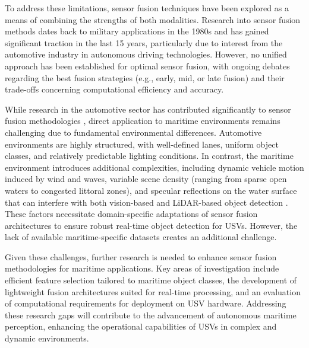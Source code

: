 \documentclass{erauthesis}
\begin{document}
To address these limitations, sensor fusion techniques have been explored as a means of combining the strengths of both modalities. 
Research into sensor fusion methods dates back to military applications in the 1980s and has gained significant traction in the last 15 years, particularly due to interest from the automotive industry in autonomous driving technologies. However, no unified approach has been established for optimal sensor fusion, with ongoing debates regarding the best fusion strategies (e.g., early, mid, or late fusion) and their trade-offs concerning computational efficiency and accuracy.

While research in the automotive sector has contributed significantly to sensor fusion methodologies \cite{yeong2021,clunie2021,roriz2022,cui2022,das2022,liu2023a}, direct application to maritime environments remains challenging due to fundamental environmental differences. 
Automotive environments are highly structured, with well-defined lanes, uniform object classes, and relatively predictable lighting conditions. 
In contrast, the maritime environment introduces additional complexities, including dynamic vehicle motion induced by wind and waves, variable scene density (ranging from sparse open waters to congested littoral zones), and specular reflections on the water surface that can interfere with both vision-based \cite{liu2023a} and \ac{LiDAR}-based object detection \cite{ahmed2024}.%
These factors necessitate domain-specific adaptations of sensor fusion architectures to ensure robust real-time object detection for \acp{USV}. 
However, the lack of available maritime-specific datasets \cite{jun-hwa2022,su2023,thompson2023} creates an additional challenge.

Given these challenges, further research is needed to enhance sensor fusion methodologies for maritime applications. 
Key areas of investigation include efficient feature selection tailored to maritime object classes, the development of lightweight fusion architectures suited for real-time processing, and an evaluation of computational requirements for deployment on \ac{USV} hardware. 
Addressing these research gaps will contribute to the advancement of autonomous maritime perception, enhancing the operational capabilities of \acp{USV} in complex and dynamic environments.
\end{document}
